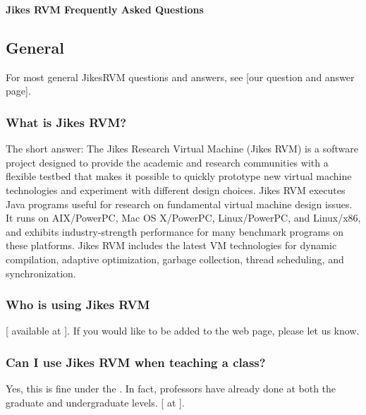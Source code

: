 \begin{center}  
{\bf Jikes RVM Frequently Asked Questions}
\end{center}

\subsection{General}

For most general Jikes\TMweb RVM questions and answers, see
\xlink*{\texttt{\QandAURL}}[our question and answer page]{\QandAURL}.

\subsubsection{What is Jikes RVM?} 

The short answer:
The Jikes Research Virtual Machine (Jikes RVM) is a software project
designed to provide the academic and research communities with a
flexible testbed that makes it possible to quickly prototype new
virtual machine technologies and experiment with different design
choices.  Jikes RVM executes Java\TMweb{} programs useful for research on
fundamental virtual machine design issues.
It runs on AIX\TMweb{}/PowerPC\TMweb{}, Mac OS X/PowerPC,
Linux\Rweb{}/PowerPC, and Linux/x86, 
and exhibits industry-strength performance for many benchmark programs
on these platforms.  Jikes RVM includes the latest VM
technologies for dynamic compilation, adaptive optimization, garbage
collection, thread scheduling, and synchronization.

\subsubsection{Who is using Jikes RVM}

[ available at
{\tt \RVMUsersURL}]{\RVMUsersURL}.  If you would like to 
be added to the web page, please let us know.

\subsubsection{Can I use Jikes RVM when teaching a class?}

Yes, this is fine under the
.  In fact,  professors
have already done at both the graduate and undergraduate levels.
[ at {\tt \RVMTeachingResourcesURL}]{\RVMTeachingResourcesURL}.

